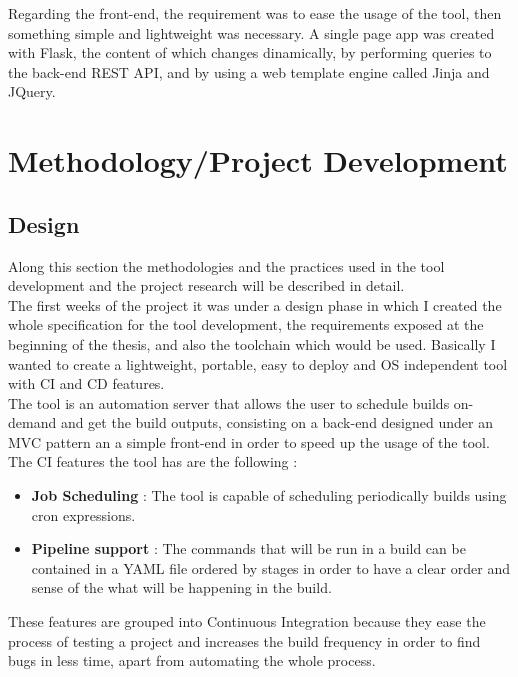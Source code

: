 \documentclass{article}
\begin{document}
Regarding the front-end, the requirement was to ease the usage of the tool, then something simple and lightweight was necessary. A single page app was created with Flask, the content of which changes dinamically, by performing queries to the back-end REST API, and by using a web template engine called Jinja and JQuery.


\newpage
\section{Methodology/Project Development}
\subsection{Design}
Along this section the methodologies and the practices used in the tool development and the project research will be described in detail.
~\\

The first weeks of the project it was under a design phase in which I created the whole specification for the tool development, the requirements exposed at the beginning of the thesis, and also the toolchain which would be used. Basically I wanted to create a lightweight, portable, easy to deploy and OS independent tool with CI and CD features. 
~\\

The tool is an automation server that allows the user to schedule builds on-demand and get the build outputs, consisting on a back-end designed under an MVC pattern an a simple front-end in order to speed up the usage of the tool.
~\\

The CI features the tool has are the following :

\begin{itemize}
    \item \textbf{Job Scheduling} : The tool is capable of scheduling periodically builds using cron expressions.
    \item \textbf{Pipeline support} : The commands that will be run in a build can be contained in a YAML file ordered by stages in order to have a clear order and sense of the what will be happening in the build.
\end{itemize}

These features are grouped into Continuous Integration because they ease the process of testing a project and increases the build frequency in order to find bugs in less time, apart from automating the whole process.
~\\
\end{document}
